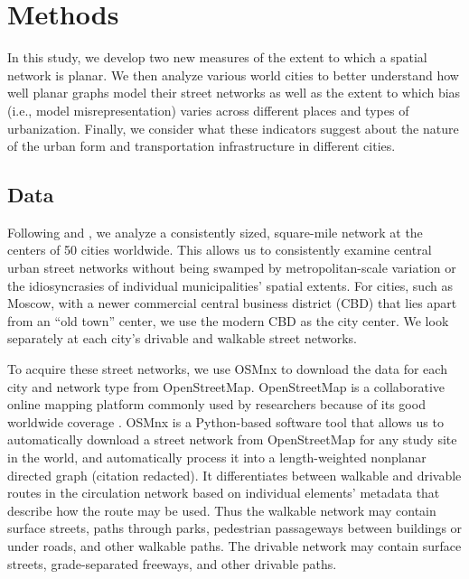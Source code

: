 \documentclass[Afour,sageh,times]{sagej}
\begin{document}
\section{Methods}

In this study, we develop two new measures of the extent to which a spatial network is planar. We then analyze various world cities to better understand how well planar graphs model their street networks as well as the extent to which bias (i.e., model misrepresentation) varies across different places and types of urbanization. Finally, we consider what these indicators suggest about the nature of the urban form and transportation infrastructure in different cities.

\subsection{Data}

Following \citet{jacobs_great_1995} and \citet{cardillo_structural_2006}, we analyze a consistently sized, square-mile network at the centers of 50 cities worldwide. This allows us to consistently examine central urban street networks without being swamped by metropolitan-scale variation or the idiosyncrasies of individual municipalities' spatial extents. For cities, such as Moscow, with a newer commercial central business district (CBD) that lies apart from an \enquote{old town} center, we use the modern CBD as the city center. We look separately at each city's drivable and walkable street networks.

To acquire these street networks, we use OSMnx to download the data for each city and network type from OpenStreetMap. OpenStreetMap is a collaborative online mapping platform commonly used by researchers because of its good worldwide coverage \citep{haklay_how_2010,jokar_arsanjani_openstreetmap_2015}. OSMnx is a Python-based software tool that allows us to automatically download a street network from OpenStreetMap for any study site in the world, and automatically process it into a length-weighted nonplanar directed graph (citation redacted). It differentiates between walkable and drivable routes in the circulation network based on individual elements' metadata that describe how the route may be used. Thus the walkable network may contain surface streets, paths through parks, pedestrian passageways between buildings or under roads, and other walkable paths. The drivable network may contain surface streets, grade-separated freeways, and other drivable paths.
\end{document}
